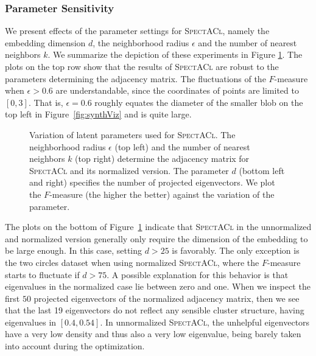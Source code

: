 \subsubsection{Parameter Sensitivity}
We present effects of the parameter settings for \textsc{SpectACl}, namely the embedding dimension $d$, the neighborhood radius $\epsilon$ and the number of nearest neighbors $k$. We summarize the depiction of these experiments in Figure \ref{fig:paramPlot}. The plots on the top row show that the results of \textsc{SpectACl} are robust to the parameters determining the adjacency matrix. The fluctuations of the $F$-measure when $\epsilon>0.6$ are understandable, since the coordinates of points are limited to $[0,3]$. That is, $\epsilon=0.6$ roughly equates the diameter of the smaller blob on the top left in Figure~\ref{fig:synthViz} and is quite large. 
\begin{figure}[t]
\centering

\caption{Variation of latent parameters used for \textsc{SpectACl}. The neighborhood radius $\epsilon$ (top left) and the number of nearest neighbors $k$ (top right) determine the adjacency matrix for \textsc{SpectACl} and its normalized version. The parameter $d$ (bottom left and right) specifies the number of projected eigenvectors. We plot the $F$-measure (the higher the better) against the variation of the parameter.}
\label{fig:paramPlot}
\end{figure}
The plots on the bottom of Figure~\ref{fig:paramPlot} indicate that \textsc{SpectACl} in the unnormalized and normalized version generally only require the dimension of the embedding to be large enough. In this case, setting $d>25$ is favorably. The only exception is the two circles dataset when using normalized \textsc{SpectACl}, where the $F$-measure starts to fluctuate if $d>75$. A possible explanation for this behavior is that eigenvalues in the normalized case lie between zero and one. When we inspect the first $50$ projected eigenvectors of the normalized adjacency matrix, then we see that the last 19 eigenvectors do not reflect any sensible cluster structure, having eigenvalues in $[0.4,0.54]$. In unnormalized \textsc{SpectACl}, the unhelpful eigenvectors have a very low density and thus also a very low eigenvalue, being barely taken into account during the optimization.

